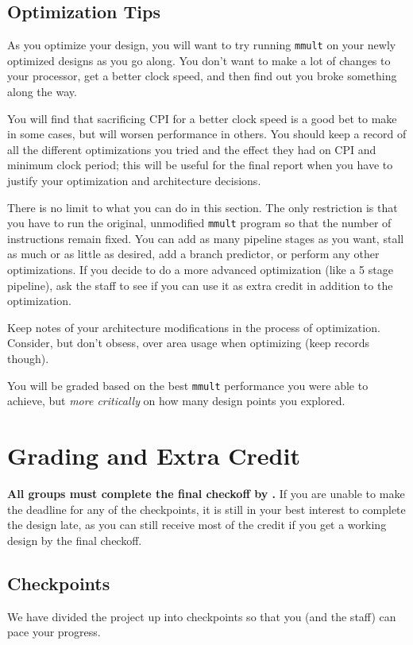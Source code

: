 \documentclass[11pt]{article}
\begin{document}
\subsection{Optimization Tips}
As you optimize your design, you will want to try running \verb|mmult| on your newly optimized designs as you go along. You don't want to make a lot of changes to your processor, get a better clock speed, and then find out you broke something along the way.

You will find that sacrificing CPI for a better clock speed is a good bet to make in some cases, but will worsen performance in others.
You should keep a record of all the different optimizations you tried and the effect they had on CPI and minimum clock period; this will be useful for the final report when you have to justify your optimization and architecture decisions.

There is no limit to what you can do in this section.
The only restriction is that you have to run the original, unmodified \verb|mmult| program so that the number of instructions remain fixed.
You can add as many pipeline stages as you want, stall as much or as little as desired, add a branch predictor, or perform any other optimizations.
If you decide to do a more advanced optimization (like a 5 stage pipeline), ask the staff to see if you can use it as extra credit in addition to the optimization.

Keep notes of your architecture modifications in the process of optimization.
Consider, but don't obsess, over area usage when optimizing (keep records though).

You will be graded based on the best \verb|mmult| performance you were able to achieve, but \textit{more critically} on how many design points you explored.
\pagebreak

\section{Grading and Extra Credit}
\textbf{All groups must complete the final checkoff by \finalCheckoffDueDate.}
If you are unable to make the deadline for any of the checkpoints, it is still in your best interest to complete the design late, as you can still receive most of the credit if you get a working design by the final checkoff.

\subsection{Checkpoints}
\label{checkoff}
We have divided the project up into checkpoints so that you (and the staff) can pace your progress.
\end{document}

